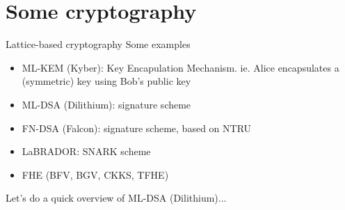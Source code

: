 \documentclass{beamer}
\theoremstyle{customstyle}
\newtheorem{defn}[thm]{Definition}
\newcommand{\Zz}{\mathbb{Z}}
\begin{document}
\section[Some cryptography]{Some cryptography}

% 
% 
% 
% 

\begin{frame}{Lattice-based cryptography}
  Some examples
  \begin{itemize}
    \item ML-KEM (Kyber): Key Encapulation Mechanism. ie. Alice encapsulates a (symmetric) key using Bob's public key
    \item ML-DSA (Dilithium): signature scheme
    \item FN-DSA (Falcon): signature scheme, based on NTRU
    \item LaBRADOR: SNARK scheme
    \item FHE (BFV, BGV, CKKS, TFHE)
  \end{itemize}

  \vspace{1.0cm}
  \pause
  Let's do a quick overview of ML-DSA (Dilithium)...
\end{frame}
\end{document}
